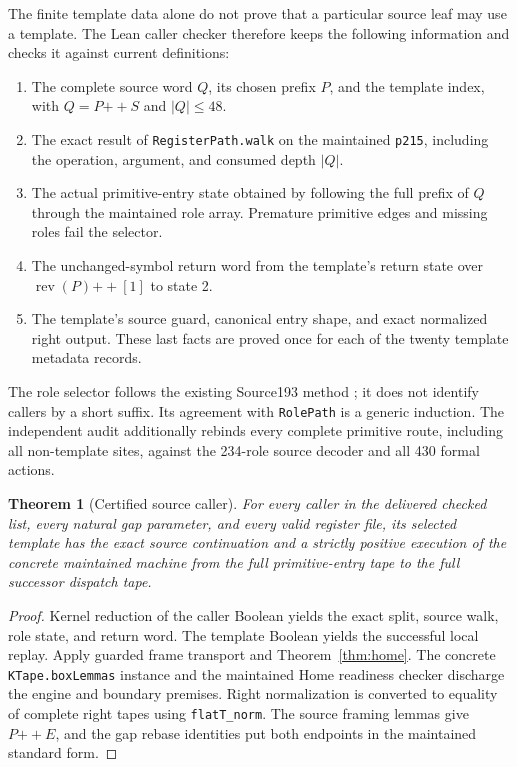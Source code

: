 \documentclass[11pt]{article}
\newtheorem{theorem}{Theorem}[section]
\theoremstyle{definition}\newtheorem{definition}[theorem]{Definition}
\theoremstyle{remark}\newtheorem{remark}[theorem]{Remark}
\newcommand{\cat}{\mathbin{+\!+}}
\newcommand{\rev}{\operatorname{rev}}
\newcommand{\code}[1]{\nolinkurl{#1}}
\begin{document}
The finite template data alone do not prove that a particular source leaf may use a template. The Lean caller checker therefore keeps the following information and checks it against current definitions:
\begin{enumerate}
\item The complete source word $Q$, its chosen prefix $P$, and the template index, with $Q=P\cat S$ and $|Q|\leq48$.
\item The exact result of \code{RegisterPath.walk} on the maintained \code{p215}, including the operation, argument, and consumed depth $|Q|$.
\item The actual primitive-entry state obtained by following the full prefix of $Q$ through the maintained role array. Premature primitive edges and missing roles fail the selector.
\item The unchanged-symbol return word from the template's return state over $\rev(P)\cat[1]$ to state 2.
\item The template's source guard, canonical entry shape, and exact normalized right output. These last facts are proved once for each of the twenty template metadata records.
\end{enumerate}

The role selector follows the existing Source193 method \cite{residual}; it does not identify callers by a short suffix. Its agreement with \code{RolePath} is a generic induction. The independent audit additionally rebinds every complete primitive route, including all non-template sites, against the 234-role source decoder and all 430 formal actions.

\begin{theorem}[Certified source caller]
For every caller in the delivered checked list, every natural gap parameter, and every valid register file, its selected template has the exact source continuation and a strictly positive execution of the concrete maintained machine from the full primitive-entry tape to the full successor dispatch tape.
\end{theorem}
\begin{proof}
Kernel reduction of the caller Boolean yields the exact split, source walk, role state, and return word. The template Boolean yields the successful local replay. Apply guarded frame transport and Theorem~\ref{thm:home}. The concrete \code{KTape.boxLemmas} instance and the maintained Home readiness checker discharge the engine and boundary premises. Right normalization is converted to equality of complete right tapes using \code{flatT_norm}. The source framing lemmas give $P\cat E$, and the gap rebase identities put both endpoints in the maintained standard form.
\end{proof}
\end{document}
